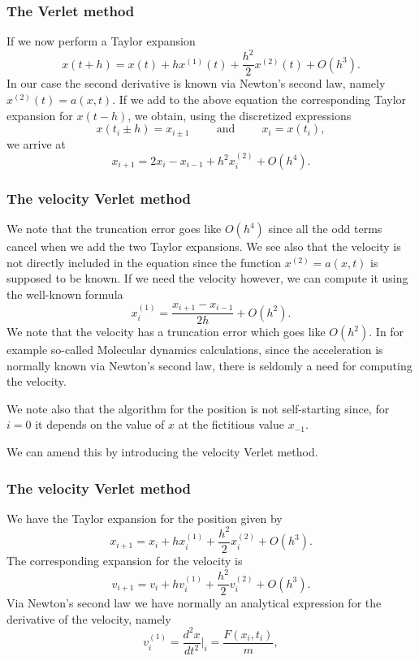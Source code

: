 \documentclass{beamer}
\begin{document}
\begin{frame}
\frametitle{The Verlet method}

\begin{block}{}
If we now perform a Taylor expansion
\[
x(t+h) = x(t)+hx^{(1)}(t)+\frac{h^2}{2}x^{(2)}(t)+O(h^3).
\]
In our case the second derivative is known via Newton's second law, namely $x^{(2)}(t)=a(x,t)$.
If we add to the above equation the corresponding Taylor expansion for $x(t-h)$, we obtain, using the
discretized expressions
\[
x(t_i\pm h) = x_{i\pm 1} \hspace{1cm}\mathrm{and}\hspace{1cm} x_i=x(t_i),
\]
we arrive at 
\[
x_{i+1} = 2x_i - x_{i-1} +h^2x^{(2)}_i+O(h^4).
\]
\end{block}
\end{frame}

\begin{frame}
\frametitle{The velocity Verlet method}

\begin{block}{}
We note that the truncation error goes like $O(h^4)$ since all the odd terms cancel when we add the two Taylor expansions.
We see also that the velocity is not directly included in the equation since the function
$x^{(2)}=a(x,t)$ is supposed to be known. If we need the velocity however, we can compute it using the well-known
formula
\[
x^{(1)}_i=\frac{x_{i+1}-x_{i-1}}{2h}+O(h^2).
\]
We note that the velocity has a truncation error which goes like $O(h^2)$. In for example so-called Molecular dynamics calculations,
since the acceleration is normally known via Newton's second law, there is seldomly a need for computing the velocity.

We note also that the algorithm for the position is not self-starting since, for $i=0$ it depends on the value of $x$ 
at the fictitious value $x_{-1}$. 

We can amend this by introducing the velocity Verlet method.
\end{block}
\end{frame}

\begin{frame}
\frametitle{The velocity Verlet method}

\begin{block}{}
We have the Taylor expansion for the position given by
\[
x_{i+1} = x_i+hx^{(1)}_i+\frac{h^2}{2}x^{(2)}_i+O(h^3).
\]
The corresponding expansion for the velocity is 
\[
v_{i+1} = v_i+hv^{(1)}_i+\frac{h^2}{2}v^{(2)}_i+O(h^3).
\]
Via Newton's second law we have normally an analytical expression for the derivative of the velocity, namely
\[
v^{(1)}_i = \frac{d^2 x}{dt^2}\vert_{i}= \frac{F(x_i,t_i)}{m},
\]
\end{block}
\end{frame}
\end{document}
